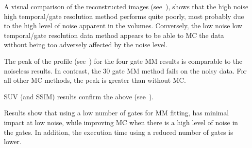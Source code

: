             A visual comparison of the reconstructed images (see~), shows that the high noise high temporal/gate resolution method performs quite poorly, most probably due to the high level of noise apparent in the volumes. Conversely, the low noise low temporal/gate resolution data method appears to be able to \gls{MC} the data without being too adversely affected by the noise level.
             
            The peak of the profile (see~) for the four gate \gls{MM} results is comparable to the noiseless results. In contrast, the $30$ gate \gls{MM} method fails on the noisy data. For all other \gls{MC} methods, the peak is greater than without \gls{MC}.
             
            \gls{SUV} (and \gls{SSIM}) results confirm the above (see~).
        
        
        Results show that using a low number of gates for \gls{MM} fitting, has minimal impact at low noise, while improving \gls{MC} when there is a high level of noise in the gates. In addition, the execution time using a reduced number of gates is lower.
            
